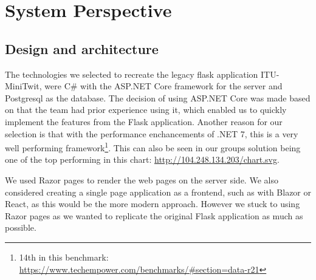 \newpage
\section{System Perspective}




\subsection{Design and architecture}

The technologies we selected to recreate the legacy flask application ITU-MiniTwit, were C\# with the ASP.NET Core framework for the server and Postgresql as the database. The decision of using ASP.NET Core was made based on that the team had prior experience using it, which enabled us to quickly implement the features from the Flask application. Another reason for our selection is that with the performance enchancements of .NET 7, this is a very well performing framework\footnote{14th in this benchmark: 
\url{https://www.techempower.com/benchmarks/#section=data-r21}}. This can also be seen in our groups solution being one of the top performing in this chart: \url{http://104.248.134.203/chart.svg}.

We used Razor pages to render the web pages on the server side. We also considered creating a single page application as a frontend, such as with Blazor or React, as this would be the more modern approach. However we stuck to using Razor pages as we wanted to replicate the original Flask application as much as possible.


